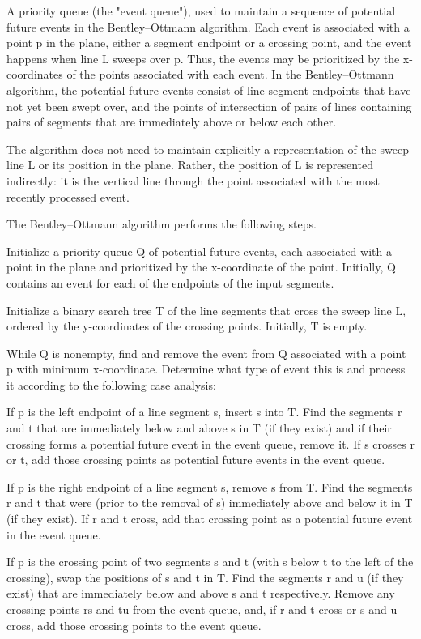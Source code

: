\documentclass[10pt,letterpaper,twocolumn,twosided]{article}
\begin{document}
A priority queue (the "event queue"), used to maintain a sequence of potential future events in the Bentley–Ottmann algorithm. Each event is associated with a point p in the plane, either a segment endpoint or a crossing point, and the event happens when line L sweeps over p. Thus, the events may be prioritized by the x-coordinates of the points associated with each event. In the Bentley–Ottmann algorithm, the potential future events consist of line segment endpoints that have not yet been swept over, and the points of intersection of pairs of lines containing pairs of segments that are immediately above or below each other.

The algorithm does not need to maintain explicitly a representation of the sweep line L or its position in the plane. Rather, the position of L is represented indirectly: it is the vertical line through the point associated with the most recently processed event.

The Bentley–Ottmann algorithm performs the following steps.

Initialize a priority queue Q of potential future events, each associated with a point in the plane and prioritized by the x-coordinate of the point. Initially, Q contains an event for each of the endpoints of the input segments.

Initialize a binary search tree T of the line segments that cross the sweep line L, ordered by the y-coordinates of the crossing points. Initially, T is empty.

While Q is nonempty, find and remove the event from Q associated with a point p with minimum x-coordinate. Determine what type of event this is and process it according to the following case analysis:

If p is the left endpoint of a line segment s, insert s into T. Find the segments r and t that are immediately below and above s in T (if they exist) and if their crossing forms a potential future event in the event queue, remove it. If s crosses r or t, add those crossing points as potential future events in the event queue.

If p is the right endpoint of a line segment s, remove s from T. Find the segments r and t that were (prior to the removal of s) immediately above and below it in T (if they exist). If r and t cross, add that crossing point as a potential future event in the event queue.

If p is the crossing point of two segments s and t (with s below t to the left of the crossing), swap the positions of s and t in T. Find the segments r and u (if they exist) that are immediately below and above s and t respectively. Remove any crossing points rs and tu from the event queue, and, if r and t cross or s and u cross, add those crossing points to the event queue.
\end{document}

